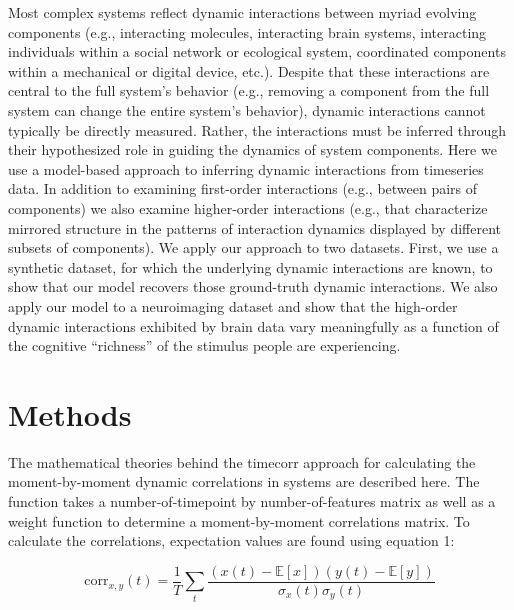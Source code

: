   
  Most complex systems reflect dynamic interactions between myriad
  evolving components (e.g., interacting molecules, interacting brain
  systems, interacting individuals within a social network or
  ecological system, coordinated components within a mechanical or
  digital device, etc.).  Despite that these interactions are central
  to the full system's behavior (e.g., removing a component from the
  full system can change the entire system's behavior), dynamic
  interactions cannot typically be directly measured.  Rather, the
  interactions must be inferred through their hypothesized role in
  guiding the dynamics of system components.  Here we use a
  model-based approach to inferring dynamic interactions from
  timeseries data.  In addition to examining first-order interactions
  (e.g., between pairs of components) we also examine higher-order
  interactions (e.g., that characterize mirrored structure in the
  patterns of interaction dynamics displayed by different subsets of
  components).  We apply our approach to two datasets.  First, we use
  a synthetic dataset, for which the underlying dynamic interactions
  are known, to show that our model recovers those ground-truth
  dynamic interactions.  We also apply our model to a neuroimaging
  dataset and show that the high-order dynamic interactions exhibited
  by brain data vary meaningfully as a function of the cognitive
  ``richness'' of the stimulus people are experiencing.



\section*{Methods}

The mathematical theories behind the timecorr approach for calculating the moment-by-moment dynamic correlations in systems are described here. The function takes a number-of-timepoint by number-of-features matrix as well as a weight function to determine a moment-by-moment correlations matrix. To calculate the correlations, expectation values are found using equation 1: 

\begin{equation}
\mathrm{corr}_{x,y}(t) = \frac{1}{T} \sum_{t} \frac{\left(x(t)-\mathbb{E}[x]\right)\left(y(t)-\mathbb{E}[y]\right)}{\sigma_{x}(t)\sigma_{y}(t)}
\end{equation}

